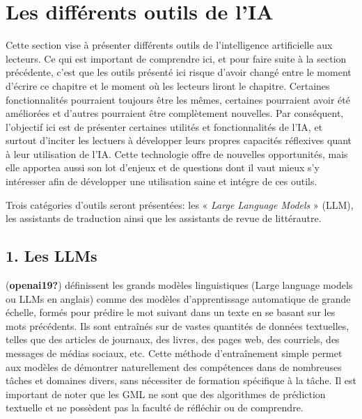 \documentclass[
  letterpaper,
  DIV=11,
  numbers=noendperiod]{scrreprt}
\begin{document}
\hypertarget{les-diffuxe9rents-outils-de-lia}{%
\section{Les différents outils de
l'IA}\label{les-diffuxe9rents-outils-de-lia}}

Cette section vise à présenter différents outils de l'intelligence
artificielle aux lecteurs. Ce qui est important de comprendre ici, et
pour faire suite à la section précédente, c'est que les outils présenté
ici risque d'avoir changé entre le moment d'écrire ce chapitre et le
moment où les lecteurs liront le chapitre. Certaines fonctionnalités
pourraient toujours être les mêmes, certaines pourraient avoir été
améliorées et d'autres pourraient être complètement nouvelles. Par
conséquent, l'objectif ici est de présenter certaines utilités et
fonctionnalités de l'IA, et surtout d'inciter les lectuers à développer
leurs propres capacités réflexives quant à leur utilisation de l'IA.
Cette technologie offre de nouvelles opportunités, mais elle apportea
aussi son lot d'enjeux et de questions dont il vaut mieux s'y intéresser
afin de développer une utilisation saine et intégre de ces outils.

Trois catégories d'outils seront présentées: les « \emph{Large Language
Models} » (LLM), les assistants de traduction ainsi que les assistants
de revue de littérautre.

\hypertarget{les-llms}{%
\subsection{1. Les LLMs}\label{les-llms}}

(\textbf{openai19?}) définissent les grands modèles linguistiques (Large
language models ou LLMs en anglais) comme des modèles d'apprentissage
automatique de grande échelle, formés pour prédire le mot suivant dans
un texte en se basant sur les mots précédents. Ils sont entraînés sur de
vastes quantités de données textuelles, telles que des articles de
journaux, des livres, des pages web, des courriels, des messages de
médias sociaux, etc. Cette méthode d'entraînement simple permet aux
modèles de démontrer naturellement des compétences dans de nombreuses
tâches et domaines divers, sans nécessiter de formation spécifique à la
tâche. Il est important de noter que les GML ne sont que des algorithmes
de prédiction textuelle et ne possèdent pas la faculté de réfléchir ou
de comprendre.
\end{document}
